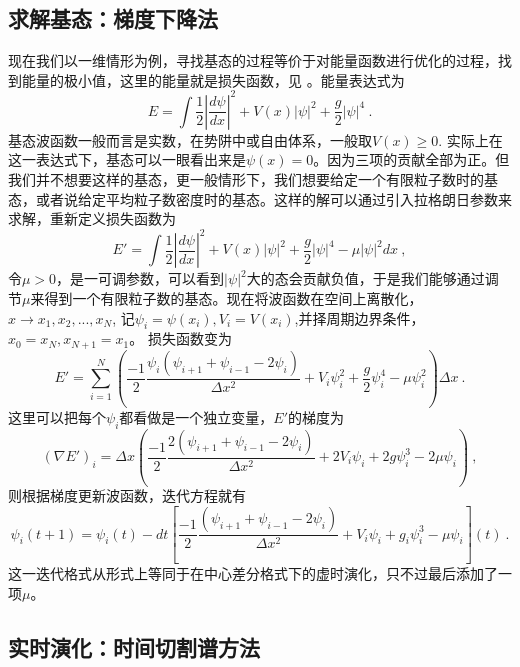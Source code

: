 \subsection{求解基态：梯度下降法}
现在我们以一维情形为例，寻找基态的过程等价于对能量函数进行优化的过程，找到能量的极小值，这里的能量就是损失函数，见 。能量表达式为
\begin{equation}
E = \int \frac{1}{2}|\frac{d \psi}{dx}|^2 + V(x)|\psi|^2 + \frac{g}{2}|\psi|^4~.
\end{equation}
基态波函数一般而言是实数，在势阱中或自由体系，一般取$V(x)\ge 0$. 实际上在这一表达式下，基态可以一眼看出来是$\psi(x) = 0$。因为三项的贡献全部为正。但我们并不想要这样的基态，更一般情形下，我们想要给定一个有限粒子数时的基态，或者说给定平均粒子数密度时的基态。这样的解可以通过引入拉格朗日参数来求解，重新定义损失函数为
\begin{equation}
E' = \int \frac{1}{2}|\frac{d\psi}{dx}|^2 + V(x)|\psi|^2 + \frac{g}{2}|\psi|^4 -\mu |\psi|^2 dx ~,
\end{equation}
令$\mu>0$，是一可调参数，可以看到$|\psi|^2$大的态会贡献负值，于是我们能够通过调节$\mu$来得到一个有限粒子数的基态。现在将波函数在空间上离散化，$x\rightarrow x_1,x_2,...,x_N$, 记$\psi_i = \psi(x_i),V_i = V(x_i)$,并择周期边界条件，$x_0 = x_N, x_{N+1}= x_1$。 损失函数变为
\begin{equation}
E' =\sum_{i=1}^N (\frac{-1}{2} \frac{\psi_i(\psi_{i+1}+\psi_{i-1}-2\psi_i)}{\Delta x^2} + V_i\psi_{i}^2 + \frac{g}{2}\psi_i^4 - \mu \psi_i^2) \Delta x~.
\end{equation}
这里可以把每个$\psi_i$都看做是一个独立变量，$E'$的梯度为
\begin{equation}
(\nabla E')_i = \Delta x (\frac{-1}{2}\frac{2(\psi_{i+1}+\psi_{i-1}-2\psi_i)}{\Delta x^2} + 2V_i \psi_i + 2g \psi_i^3 - 2\mu \psi_i ) ~,
\end{equation}
则根据梯度更新波函数，迭代方程就有
\begin{equation}
\psi_i(t+1) = \psi_i(t) -dt [\frac{-1}{2}\frac{(\psi_{i+1} +\psi_{i-1}-2\psi_i )}{\Delta x^2} + V_i \psi_i + g_i \psi_i^3 -\mu \psi_i](t) ~.
\end{equation}
这一迭代格式从形式上等同于在中心差分格式下的虚时演化，只不过最后添加了一项$\mu$。

\subsection{实时演化：时间切割谱方法}


